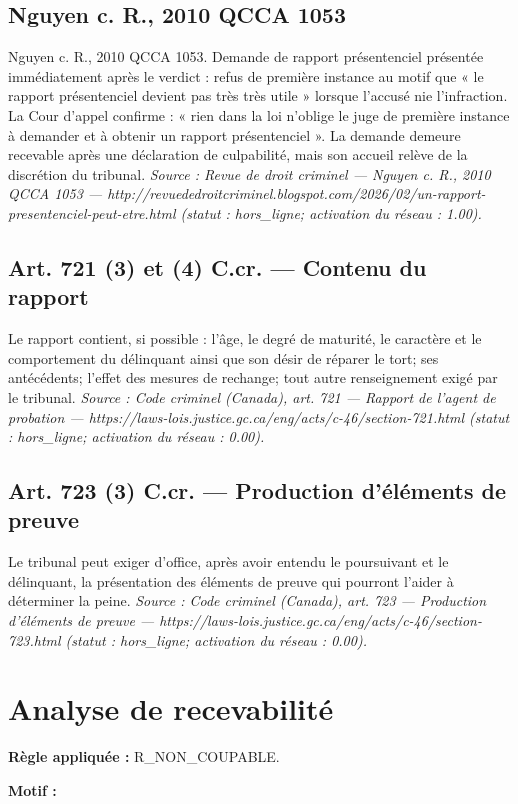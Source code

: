 \documentclass[12pt,a4paper]{article}
\begin{document}
\subsection*{Nguyen c. R., 2010 QCCA 1053}
Nguyen c. R., 2010 QCCA 1053. Demande de rapport présentenciel présentée immédiatement après le verdict : refus de première instance au motif que « le rapport présentenciel devient pas très très utile » lorsque l'accusé nie l'infraction. La Cour d'appel confirme : « rien dans la loi n'oblige le juge de première instance à demander et à obtenir un rapport présentenciel ». La demande demeure recevable après une déclaration de culpabilité, mais son accueil relève de la discrétion du tribunal.
\emph{Source : Revue de droit criminel — Nguyen c. R., 2010 QCCA 1053 — http://revuededroitcriminel.blogspot.com/2026/02/un-rapport-presentenciel-peut-etre.html (statut : hors\_ligne; activation du réseau : 1.00).}

\subsection*{Art. 721 (3) et (4) C.cr. — Contenu du rapport}
Le rapport contient, si possible : l'âge, le degré de maturité, le caractère et le comportement du délinquant ainsi que son désir de réparer le tort; ses antécédents; l'effet des mesures de rechange; tout autre renseignement exigé par le tribunal.
\emph{Source : Code criminel (Canada), art. 721 — Rapport de l'agent de probation — https://laws-lois.justice.gc.ca/eng/acts/c-46/section-721.html (statut : hors\_ligne; activation du réseau : 0.00).}

\subsection*{Art. 723 (3) C.cr. — Production d'éléments de preuve}
Le tribunal peut exiger d'office, après avoir entendu le poursuivant et le délinquant, la présentation des éléments de preuve qui pourront l'aider à déterminer la peine.
\emph{Source : Code criminel (Canada), art. 723 — Production d'éléments de preuve — https://laws-lois.justice.gc.ca/eng/acts/c-46/section-723.html (statut : hors\_ligne; activation du réseau : 0.00).}


\section{Analyse de recevabilité}
\textbf{Règle appliquée :} R\_NON\_COUPABLE.

\textbf{Motif :}
\end{document}
